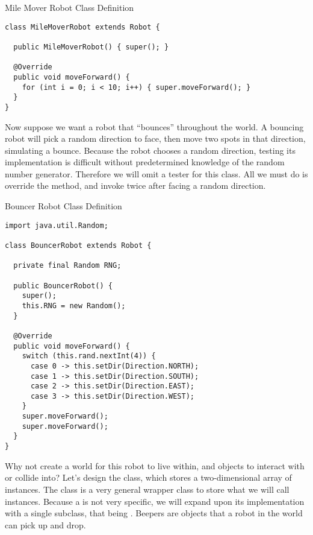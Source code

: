 \begin{cl}{Mile Mover Robot Class Definition}
\begin{lstlisting}[language=MyJava]
class MileMoverRobot extends Robot {

  public MileMoverRobot() { super(); }

  @Override
  public void moveForward() {
    for (int i = 0; i < 10; i++) { super.moveForward(); }
  }
}
\end{lstlisting}
\end{cl}

Now suppose we want a robot that ``bounces'' throughout the world. A bouncing robot will pick a random direction to face, then move two spots in that direction, simulating a bounce. Because the robot chooses a random direction, testing its implementation is difficult without predetermined knowledge of the random number generator. Therefore we will omit a tester for this class. All we must do is override the  method, and invoke  twice after facing a random direction.

\begin{cl}{Bouncer Robot Class Definition}
\begin{lstlisting}[language=MyJava]
import java.util.Random;

class BouncerRobot extends Robot {

  private final Random RNG;

  public BouncerRobot() {
    super();
    this.RNG = new Random();
  }

  @Override
  public void moveForward() {
    switch (this.rand.nextInt(4)) {
      case 0 -> this.setDir(Direction.NORTH);
      case 1 -> this.setDir(Direction.SOUTH);
      case 2 -> this.setDir(Direction.EAST);
      case 3 -> this.setDir(Direction.WEST);
    }
    super.moveForward();
    super.moveForward();
  }
}
\end{lstlisting}
\end{cl}

Why not create a world for this robot to live within, and objects to interact with or collide into? Let's design the  class, which stores a two-dimensional array of  instances. The  class is a very general wrapper class to store what we will call  instances. Because a  is not very specific, we will expand upon its implementation with a single subclass, that being . Beepers are objects that a robot in the world can pick up and drop. 

